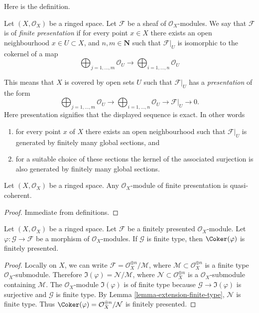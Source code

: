 \noindent
Here is the definition.

\begin{definition}
\label{definition-finite-presentation}
Let $(X, \mathcal{O}_X)$ be a ringed space.
Let $\mathcal{F}$ be a sheaf of $\mathcal{O}_X$-modules.
We say that $\mathcal{F}$ is of {\it finite presentation}
if for every point $x \in X$ there exists an open neighbourhood
$x\in U \subset X$, and  $n, m \in \mathbf{N}$ such that $\mathcal{F}|_U$
is isomorphic to the cokernel of a map
$$
\bigoplus\nolimits_{j = 1, \ldots, m}
\mathcal{O}_U
\longrightarrow
\bigoplus\nolimits_{i = 1, \ldots, n}
\mathcal{O}_U
$$
\end{definition}

\noindent
This means that $X$ is covered by open sets $U$
such that $\mathcal{F}|_U$ has a {\it presentation}
of the form
$$
\bigoplus\nolimits_{j = 1, \ldots, m}
\mathcal{O}_U
\longrightarrow
\bigoplus\nolimits_{i = 1, \ldots, n}
\mathcal{O}_U
\to
\mathcal{F}|_U
\to
0.
$$
Here presentation signifies that the displayed
sequence is exact. In other words
\begin{enumerate}
\item for every point $x$ of $X$ there exists
an open neighbourhood such that $\mathcal{F}|_U$
is generated by finitely many global sections, and
\item for a suitable choice of these sections
the kernel of the associated surjection is also
generated by finitely many global sections.
\end{enumerate}

\begin{lemma}
\label{lemma-finite-presentation-quasi-coherent}
Let $(X, \mathcal{O}_X)$ be a ringed space.
Any $\mathcal{O}_X$-module of finite presentation
is quasi-coherent.
\end{lemma}

\begin{proof}
Immediate from definitions.
\end{proof}

\begin{lemma}
\label{lemma-cokernel-finite-finite-presentation}
Let $(X,\mathcal{O}_X)$ be a ringed space. Let $\mathcal{F}$ be a
finitely presented $\mathcal{O}_X$-module. Let
$\varphi : \mathcal{G} \to \mathcal{F}$ be a morphism of
$\mathcal{O}_X$-modules. If $\mathcal{G}$ is finite type, then
$\Coker(\varphi)$ is finitely presented.
\end{lemma}

\begin{proof}
Locally on $X$, we can write
$\mathcal{F} = \mathcal{O}_X^{\oplus n} / \mathcal{M}$, where
$\mathcal{M} \subset \mathcal{O}_X^{\oplus n}$ is a finite type
$\mathcal{O}_X$-submodule. Therefore
$\Im(\varphi) = \mathcal{N} / \mathcal{M}$, where
$\mathcal{N} \subset \mathcal{O}_X^{\oplus n}$ is a
$\mathcal{O}_X$-submodule containing $\mathcal{M}$.
The $\mathcal{O}_X$-module $\Im(\varphi)$ is of finite type
because $\mathcal{G} \to \Im(\varphi)$ is surjective and
$\mathcal{G}$ is finite type. By Lemma \ref{lemma-extension-finite-type},
$\mathcal{N}$ is finite type. Thus
$\Coker(\varphi) = \mathcal{O}_X^{\oplus n} / \mathcal{N}$
is finitely presented.
\end{proof}

